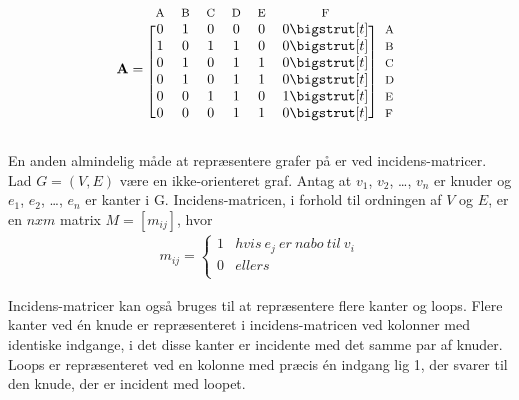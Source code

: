  \begin{equation*}
  \mathbf{A}=
  \begin{blockarray}{*{6}{c} l}
    \begin{block}{*{6}{>{$\footnotesize}c<{$}} l}
      A & B & C & D & E & F \\
    \end{block}
    \begin{block}{[*{6}{c}]>{$\footnotesize}l<{$}}
      0 & 1 & 0 & 0 & 0 & 0 \bigstrut[t]& A \\
      1 & 0 & 1 & 1 & 0 & 0 \bigstrut[t]&B \\
      0 & 1 & 0 & 1 & 1 & 0 \bigstrut[t]&C \\
      0 & 1 & 0 & 1 & 1 & 0 \bigstrut[t]& D \\
      0 & 0 & 1 & 1 & 0 & 1 \bigstrut[t]& E \\
      0 & 0 & 0 & 1 & 1 & 0 \bigstrut[t]& F \\
    \end{block}
  \end{blockarray}
\end{equation*}

En anden almindelig måde at repræsentere grafer på er ved incidens-matricer. Lad $G=(V,E)$ være en ikke-orienteret graf. Antag at $v_1$, $v_2$, \dots , $v_n$ er knuder og $e_1$, $e_2$, \dots , $e_n$ er kanter i G. Incidens-matricen, i forhold til ordningen af $V$ og $E$, er en $n x m$ matrix $M=[m_{ij}]$, hvor 
\begin{align*}
m_{ij}= \left\{\begin{array}{cc}
1 & hvis \  {e_j} \  er \  nabo \ til \ v_i \\
0 & ellers \\
\end{array}\right.
\end{align*}

Incidens-matricer kan også bruges til at repræsentere flere kanter og loops. Flere kanter ved én knude er repræsenteret i incidens-matricen ved kolonner med identiske indgange, i det disse kanter er incidente med det samme par af knuder. Loops er repræsenteret ved en kolonne med præcis én indgang lig 1, der svarer til den knude, der er incident med loopet. 

